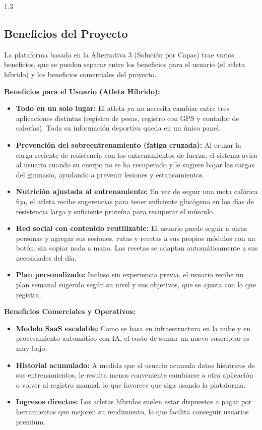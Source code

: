 \begin{spacing}{1.3}
\subsection{Beneficios del Proyecto}
La plataforma basada en la Alternativa 3 (Solución por Capas) trae varios beneficios, que se pueden separar entre los beneficios para el usuario (el atleta híbrido) y los beneficios comerciales del proyecto.

\textbf{Beneficios para el Usuario (Atleta Híbrido):}
\begin{itemize}
    \item \textbf{Todo en un solo lugar:} El atleta ya no necesita cambiar entre tres aplicaciones distintas (registro de pesas, registro con GPS y contador de calorías). Toda su información deportiva queda en un único panel.
    \item \textbf{Prevención del sobreentrenamiento (fatiga cruzada):} Al cruzar la carga reciente de resistencia con los entrenamientos de fuerza, el sistema avisa al usuario cuando su cuerpo no se ha recuperado y le sugiere bajar las cargas del gimnasio, ayudando a prevenir lesiones y estancamientos.
    \item \textbf{Nutrición ajustada al entrenamiento:} En vez de seguir una meta calórica fija, el atleta recibe sugerencias para tener suficiente glucógeno en los días de resistencia larga y suficiente proteína para recuperar el músculo.
    \item \textbf{Red social con contenido reutilizable:} El usuario puede seguir a otras personas y agregar sus sesiones, rutas y recetas a sus propios módulos con un botón, sin copiar nada a mano. Las recetas se adaptan automáticamente a sus necesidades del día.
    \item \textbf{Plan personalizado:} Incluso sin experiencia previa, el usuario recibe un plan semanal sugerido según su nivel y sus objetivos, que se ajusta con lo que registra.
\end{itemize}
\textbf{Beneficios Comerciales y Operativos:}
\begin{itemize}
    \item \textbf{Modelo SaaS escalable:} Como se basa en infraestructura en la nube y en procesamiento automático con IA, el costo de sumar un nuevo suscriptor es muy bajo.
    \item \textbf{Historial acumulado:} A medida que el usuario acumula datos históricos de sus entrenamientos, le resulta menos conveniente cambiarse a otra aplicación o volver al registro manual, lo que favorece que siga usando la plataforma.
    \item \textbf{Ingresos directos:} Los atletas híbridos suelen estar dispuestos a pagar por herramientas que mejoren su rendimiento, lo que facilita conseguir usuarios premium.
\end{itemize}

\end{spacing}
